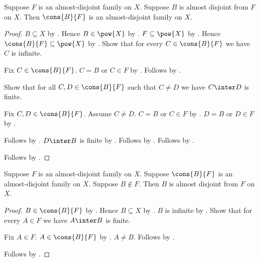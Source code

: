 \begin{proposition}\label{almost_disjoint_cons_of_compatible}
    Suppose $F$ is an almost-disjoint family on $X$.
    Suppose $B$ is almost disjoint from $F$ on $X$.
    Then $\cons{B}{F}$ is an almost-disjoint family on $X$.
\end{proposition}
\begin{proof}
    $B\subseteq X$ by .
    Hence $B\in\pow{X}$ by .
    $F\subseteq\pow{X}$
        by .
    Hence $\cons{B}{F}\subseteq\pow{X}$
        by .
    Show that for every $C\in\cons{B}{F}$ we have $C$ is infinite.
    \begin{subproof}
        Fix $C\in\cons{B}{F}$.
        $C=B$ or $C\in F$ by .
        Follows by
            .
    \end{subproof}
    Show that for all $C,D\in\cons{B}{F}$ such that $C\neq D$
        we have $C\inter D$ is finite.
    \begin{subproof}
        Fix $C,D\in\cons{B}{F}$.
        Assume $C\neq D$.
        $C=B$ or $C\in F$ by .
        $D=B$ or $D\in F$ by .
        \begin{byCase}
                Follows by
                    .
                $D\inter B$ is finite
                    by .
                Follows by .
                Follows by .
        \end{byCase}
    \end{subproof}
    Follows by .
\end{proof}

\begin{proposition}\label{almost_disjoint_cons_forward_compatible}
    Suppose $F$ is an almost-disjoint family on $X$.
    Suppose $\cons{B}{F}$ is an almost-disjoint family on $X$.
    Suppose $B\notin F$.
    Then $B$ is almost disjoint from $F$ on $X$.
\end{proposition}
\begin{proof}
    $B\in\cons{B}{F}$ by .
    Hence $B\subseteq X$
        by .
    $B$ is infinite by .
    Show that for every $A\in F$ we have $A\inter B$ is finite.
    \begin{subproof}
        Fix $A\in F$.
        $A\in\cons{B}{F}$ by .
        $A\neq B$.
        Follows by
            .
    \end{subproof}
    Follows by .
\end{proof}

